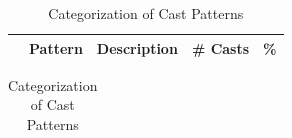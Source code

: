 

\begin{table}[t!]
\scriptsize
\centering
\caption{Categorization of Cast Patterns}
\label{table:casts:patterns}
\begin{tabularx}{\linewidth}{|r|l|X|r|r|}
\hline
    & \multicolumn{1}{|c|}{\textbf{Pattern}}
    & \multicolumn{1}{|c|}{\textbf{Description}}
    & \multicolumn{1}{|c|}{\textbf{\# Casts}}
    & \multicolumn{1}{|c|}{\textbf{\%}}
    \\ \hline

\hline
\end{tabularx}
\end{table}


\begin{table}[t!]
\scriptsize
\centering
\caption{Categorization of Cast Patterns}
\label{table:casts:categories}
\begin{tabularx}{\linewidth}{|r|l|X|r|r|r|}

\hline
\end{tabularx}
\end{table}


